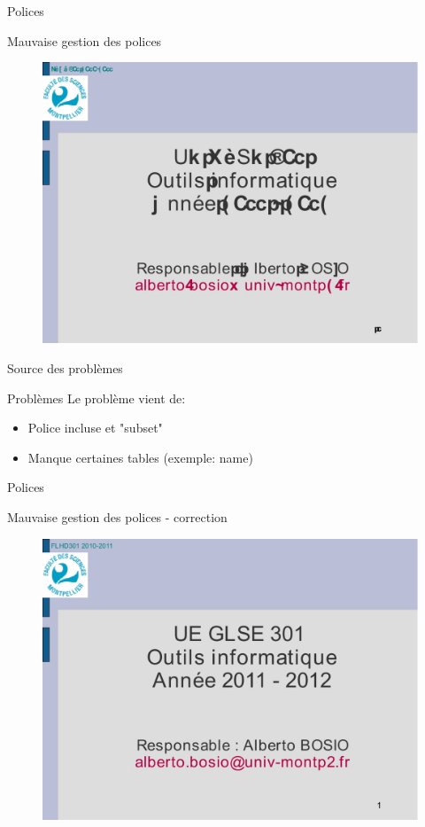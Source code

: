 \begin{frame}{Polices}

	\begin{block}{Mauvaise gestion des polices}
		\begin{figure}[h]
        		\begin{center}
         		\includegraphics[scale=0.17]{images/fail2.jpg} 
        		\end{center}
    		\end{figure}
	\end{block}
\end{frame}

\begin{frame}{Source des problèmes}
\begin{block}{Problèmes}
Le problème vient de:
\begin{itemize}
\item Police incluse et "subset"
\item Manque certaines tables (exemple: name)
\end{itemize}	
\end{block}
\end{frame}

\begin{frame}{Polices}
	\begin{block}{Mauvaise gestion des polices - correction}
		\begin{figure}[h]
    		\begin{center}
     		\includegraphics[scale=0.17]{images/succes.jpg} 
    		\end{center}
		\end{figure}
	\end{block}
\end{frame}
